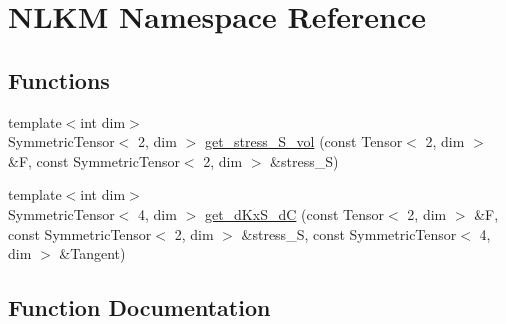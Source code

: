 \hypertarget{namespaceNLKM}{}\section{N\+L\+KM Namespace Reference}
\label{namespaceNLKM}
\subsection*{Functions}
\begin{DoxyCompactItemize}
\item 
{\footnotesize template$<$int dim$>$ }\\Symmetric\+Tensor$<$ 2, dim $>$ \hyperlink{namespaceNLKM_a1ccf48261890fc2be5d1e97f03c62ce5}{get\+\_\+stress\+\_\+\+S\+\_\+vol} (const Tensor$<$ 2, dim $>$ \&F, const Symmetric\+Tensor$<$ 2, dim $>$ \&stress\+\_\+S)
\item 
{\footnotesize template$<$int dim$>$ }\\Symmetric\+Tensor$<$ 4, dim $>$ \hyperlink{namespaceNLKM_aa0abeda2910b5d2974905bdab35bae78}{get\+\_\+d\+Kx\+S\+\_\+dC} (const Tensor$<$ 2, dim $>$ \&F, const Symmetric\+Tensor$<$ 2, dim $>$ \&stress\+\_\+S, const Symmetric\+Tensor$<$ 4, dim $>$ \&Tangent)
\end{DoxyCompactItemize}


\subsection{Function Documentation}
